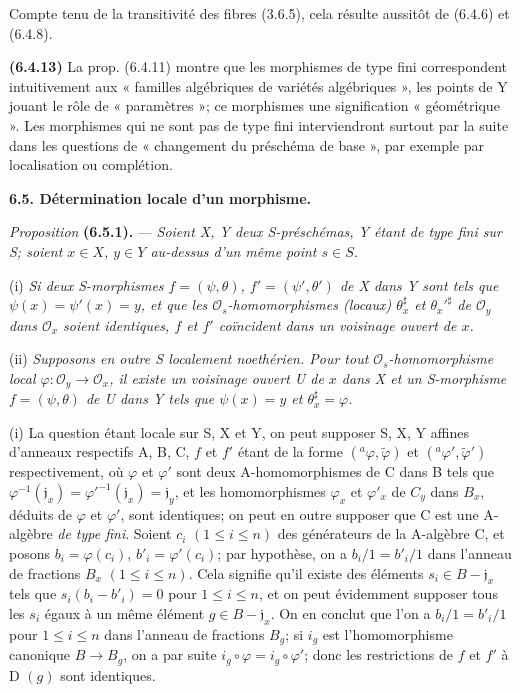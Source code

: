 Compte tenu de la transitivité des fibres (3.6.5), cela résulte aussitôt de (6.4.6) et (6.4.8).

\textbf{(6.4.13)} La prop. (6.4.11) montre que les morphismes de type fini correspondent intuitivement aux « familles algébriques de variétés algébriques », les points de Y jouant le rôle de « paramètres »; ce  morphismes  une signification « géométrique ». Les morphismes qui ne sont pas de type fini interviendront surtout par la suite dans les questions de « changement du préschéma de base », par exemple par localisation ou complétion.
\margin{$\times$}

\textbf{6.5. Détermination locale d'un morphisme.}

\textit{Proposition} \textbf{(6.5.1).} --- \textit{Soient X, Y deux S-préschémas, Y étant de type fini sur S; soient $x\in X$, $y\in Y$ au-dessus d'un même point $s\in S$.}

(i) \textit{Si deux S-morphismes $f=(\psi,\theta)$, $f'=(\psi',\theta')$ de X dans Y sont tels que $\psi(x)=\psi'(x)=y$, et que les $\mathcal O_s$-homomorphismes (locaux) $\theta_x^\sharp$ et $\theta_x'^\sharp$ de $\mathcal O_y$ dans $\mathcal O_x$ soient identiques, $f$ et $f'$ coïncident dans un voisinage ouvert de $x$.}

(ii) \textit{Supposons en outre S localement noethérien. Pour tout $\mathcal O_s$-homomorphisme local $\varphi:\mathcal O_y\to\mathcal O_x$, il existe un voisinage ouvert U de $x$ dans X et un S-morphisme $f=(\psi,\theta)$ de U dans Y tels que $\psi(x)=y$ et $\theta_x^\sharp=\varphi$.}

(i) La question étant locale sur S, X et Y, on peut supposer S, X, Y affines d'anneaux respectifs A, B, C, $f$ et $f'$ étant de la forme $({}^a\varphi,\widetilde\varphi)$ et $({}^a\varphi',\widetilde\varphi')$ respectivement, où $\varphi$ et $\varphi'$ sont deux A-homomorphismes de C dans B tels que $\varphi^{-1}(\mathfrak j_x)=\varphi'^{-1}(\mathfrak j_x)=\mathfrak j_y$, et les homomorphismes $\varphi_x$ et $\varphi'_x$ de $C_y$ dans $B_x$, déduits de $\varphi$ et $\varphi'$, sont identiques; on peut en outre supposer que C est une A-algèbre \textit{de type fini}. Soient $c_i$ $(1\leq i\leq n)$ des générateurs de la A-algèbre C, et posons $b_i=\varphi(c_i)$, $b'_i=\varphi'(c_i)$; par hypothèse, on a $b_i/1=b'_i/1$ dans l'anneau de fractions $B_x$ $(1\leq i\leq n)$. Cela signifie qu'il existe des éléments $s_i\in B-\mathfrak j_x$ tels que $s_i(b_i-b'_i)=0$ pour $1\leq i\leq n$, et on peut évidemment supposer tous les $s_i$ égaux à un même élément $g\in B-\mathfrak j_x$. On en conclut que l'on a $b_i/1=b'_i/1$ pour $1\leq i\leq n$ dans l'anneau de fractions $B_g$; si $i_g$ est l'homomorphisme canonique $B\to B_g$, on a par suite $i_g\circ\varphi=i_g\circ\varphi'$; donc les restrictions de $f$ et $f'$ à D $(g)$ sont identiques.

